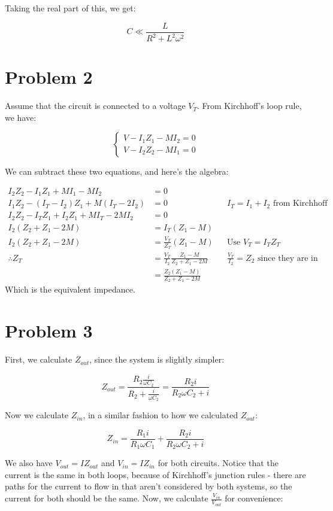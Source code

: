 \documentclass{article}
\theoremstyle{definition}
\numberwithin{equation}{section}
\numberwithin{definition}{section}
\begin{document}
Taking the real part of this, we get:

\[ C \ll \frac{L}{R^2 + L^2 \omega^2}\]

\section{Problem 2}

Assume that the circuit is connected to a voltage $V_T$. From Kirchhoff's loop rule, we have: \

\[ \begin{cases}
    V - I_1Z_1 - MI_2 = 0\\
    V - I_2Z_2 - MI_1 = 0
\end{cases}\]

We can subtract these two equations, and here's the algebra: 

\begin{align*}
    I_2Z_2 - I_1Z_1 + MI_1 - M I_2 &= 0\\
    I_1Z_2 - (I_T - I_2)Z_1 + M(I_T - 2I_2) &= 0 && I_T = I_1 + I_2 \text{ from Kirchhoff}\\
    I_2Z_2 - I_TZ_1 + I_2Z_1 + MI_T - 2MI_2 &= 0\\
    I_2(Z_2 + Z_1 - 2M) &= I_T(Z_1 - M)\\
    I_2(Z_2 + Z_1 - 2M) &= \frac{V_T}{Z_T}(Z_1 - M) && \text{Use } V_T = I_TZ_T\\
    \therefore Z_T &= \frac{V_T}{I_2} \frac{Z_1 - M}{Z_2 + Z_1 - 2M} && \frac{V_T}{I_2} = Z_2 \text{ since they are in parallel}\\
    &= \frac{Z_2(Z_1 - M)}{Z_2 + Z_1 - 2M}
\end{align*}
Which is the equivalent impedance. 

\section{Problem 3}

First, we calculate $Z_{out}$, since the system is slightly simpler:

\[Z_{out} = \frac{R_2 \frac{i}{\omega C_2}}{R_2 + \frac{i}{\omega C_2}} = \frac{R_2i}{R_2 \omega C_2 + i}\]

Now we calculate $Z_{in}$, in a similar fashion to how we calculated $Z_{out}$:

\[Z_{in} = \frac{R_1i}{R_1\omega C_1} + \frac{R_2i}{R_2\omega C_2 + i}\]

We also have $V_{out} = IZ_{out}$ and $V_{in} = IZ_{in}$ for both circuits. Notice that the current is the same in both loops, because of Kirchhoff's junction rules - there are paths for the current to flow in that aren't considered by both systems, so the current for both should be the same. Now, we calculate $\frac{V_{in}}{V_{out}}$ for convenience:
\end{document}
